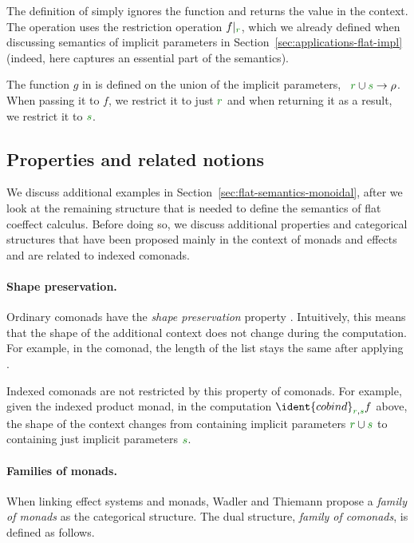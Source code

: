 \noindent
The definition of  simply ignores the function and returns the value in the context.
The  operation uses the restriction operation $\restr{f}{\cclrd{r}}$, which we 
already defined when discussing semantics of implicit parameters in Section~\ref{sec:applications-flat-impl}
(indeed,  here captures an essential part of the semantics).

The function $g$ in  is defined on the union of the implicit parameters, 
\ie~$\cclrd{r}\cup\cclrd{s}\rightarrow\rho$. When passing it to $f$, we restrict it to
just $\cclrd{r}$ and when returning it as a result, we restrict it to $\cclrd{s}$.


\subsection{Properties and related notions}

We discuss additional examples in Section~\ref{sec:flat-semantics-monoidal}, after we look at the
remaining structure that is needed to define the semantics of flat coeffect calculus. Before doing 
so, we discuss additional properties and categorical structures that have been proposed mainly in 
the context of monads and effects and are related to indexed comonads.

\paragraph{Shape preservation.}
Ordinary comonads have the \emph{shape preservation} property \cite{comonads-codo}. Intuitively, 
this means that the shape of the additional context does not change during the computation. For
example, in the  comonad, the length of the list stays the same after applying 
.

Indexed comonads are not restricted by this property of comonads. For example, given the indexed
product monad, in the computation $\ident{cobind}_{\cclrd{r}, \cclrd{s}} f$ above, the shape of
the context changes from containing implicit parameters $\cclrd{r} \cup \cclrd{s}$  to containing
just implicit parameters $\cclrd{s}$.

\paragraph{Families of monads.}
When linking effect systems and monads, Wadler and Thiemann \cite{monad-notions} propose a
\emph{family of monads} as the categorical structure. The dual structure, \emph{family of
comonads}, is defined as follows.


